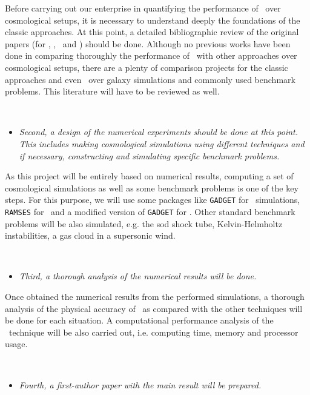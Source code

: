 \documentclass[a4,useAMS,usenatbib,usegraphicx,12pt]{article}
\begin{document}
Before carrying out our enterprise in quantifying the performance of \VPH\ over
cosmological setups, it is necessary to understand deeply the foundations of 
the classic approaches. At this point, a detailed bibliographic review of the 
original papers (for \SPH, \AMR, \VPH\ and \AREPO) should be done. Although no 
previous works have been done in comparing thoroughly the performance of \VPH\
with other approaches over cosmological setups, there are a plenty of comparison
projects for the classic approaches and even \AREPO\ over galaxy simulations and 
commonly used benchmark problems. This literature will have to be reviewed as 
well.

\

\begin{itemize}
\item[\checkmark] \textit{Second, a design of the numerical experiments should 
be done at this point. This includes making cosmological simulations using 
different techniques and if necessary, constructing and simulating specific 
benchmark problems.}
\end{itemize}


As this project will be entirely based on numerical results, computing a set of
cosmological simulations as well as some benchmark problems is one of the key 
steps. For this purpose, we will use some packages like \texttt{GADGET} 
\citep{Springel05} for \SPH\ simulations, \texttt{RAMSES} \citet{Teyssier02} 
for \AMR\ and a modified version of \texttt{GADGET} for \VPH. Other standard 
benchmark problems will be also simulated, e.g. the sod shock tube, 
Kelvin-Helmholtz instabilities, a gas cloud in a supersonic wind.

\

\begin{itemize}
\item[\checkmark] \textit{Third, a thorough analysis of the numerical results 
will be done.}
\end{itemize}


Once obtained the numerical results from the performed simulations, a thorough
analysis of the physical accuracy of \VPH\ as compared with the other techniques
will be done for each situation. A computational performance analysis of the 
\VPH\ technique will be also carried out, i.e. computing time, memory and 
processor usage.

\

\begin{itemize}
\item[\checkmark] \textit{Fourth, a first-author paper with the main result will
be prepared.}
\end{itemize}
\end{document}
